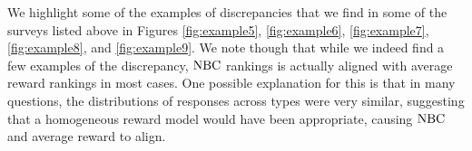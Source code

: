 
 We highlight some of the examples of discrepancies that we find in some of the surveys listed above in Figures \ref{fig:example5}, \ref{fig:example6}, \ref{fig:example7}, \ref{fig:example8},  and \ref{fig:example9}. 
%
 We note though that while we indeed find a few examples of the discrepancy, ${\rm NBC}$ rankings is actually aligned with average reward rankings in most cases.  One possible explanation for this is that in many questions, the distributions of responses across types were very similar, suggesting that a homogeneous reward model would have been appropriate, causing ${\rm NBC}$ and average reward to align.


